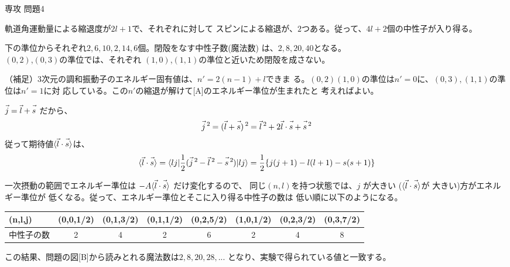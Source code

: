 \documentclass[fleqn]{jbook}
\begin{document}
\begin{answer}{専攻 問題4}{}
\def\Bracket#1#2#3{\langle{#1}|{#2}|{#3}\rangle}
\def\Mean#1{\langle{#1}\rangle}
\def\Vec#1{\vec{\mathstrut #1}}
\def\sqr{\,\raisebox{1ex}{\scriptsize{2}}}
\def\Ca{\Atom{Ca}{20}{41}$_{21}$}
\def\Sc{\Atom{Sc}{21}{41}$_{20}$}

\begin{subanswers}
\SubAnswer
  \begin{subsubanswers}
  \SubSubAnswer
    軌道角運動量による縮退度が$2l+1$で、それぞれに対して
    スピンによる縮退が、$2$つある。従って、$4l+2$個の中性子が入り得る。

  \SubSubAnswer
    下の準位からそれぞれ$2,6,10,2,14,6$個。閉殻をなす中性子数(魔法数)
    は、$2,8,20,40$となる。\\$(0,2)$,$(0,3)$の準位では、それぞれ
    $(1,0)$,$(1,1)$の準位と近いため閉殻を成さない。

（補足）3次元の調和振動子のエネルギー固有値は、$n'=2(n-1)+l$できま
る。$(0,2)(1,0)$の準位は$n'=0$に、$(0,3),(1,1)$の準位は$n'=1$に対
応している。この$n'$の縮退が解けて[A]のエネルギー準位が生まれたと
考えればよい。

  \end{subsubanswers}

\SubAnswer
  \begin{subsubanswers}
  \SubSubAnswer
    $\Vec{j}=\Vec{l}+\Vec{s}\ $だから、
%
    \[\Vec{j}\sqr%
        = (\Vec{l}+\Vec{s})\sqr%
        = \Vec{l}\sqr + 2\Vec{l}\cdot\Vec{s} + \Vec{s}\sqr \]
%
    従って期待値$\Mean{\Vec{l}\cdot\Vec{s}}$は、
%
    \[ \Mean{\Vec{l}\cdot\Vec{s}}%
      = \Bracket{lj}{\frac{1}{2}(\Vec{j}\sqr-\Vec{l}\sqr-\Vec{s}\sqr)}{lj}%
      = \frac{1}{2}\{j(j+1)-l(l+1)-s(s+1)\} \]
%

  \SubSubAnswer
    一次摂動の範囲でエネルギー準位は
    $-A\Mean{\Vec{l}\cdot\Vec{s}}$
    だけ変化するので、
    同じ$(n,l)$を持つ状態では、$j$ が大きい
    ($\Mean{\Vec{l}\cdot\Vec{s}}$が
    大きい)方がエネルギー準位が
    低くなる。従って、エネルギー準位とそこに入り得る中性子の数は
    低い順に以下のようになる。

    \begin{tabular}{|l|c|c|c|c|c|c|c|} \hline
      (n,l,j) & (0,0,1/2) & (0,1,3/2) & (0,1,1/2) & (0,2,5/2) & (1,0,1/2) & (0,2,3/2) & (0,3,7/2) \\ \hline
      中性子の数 & 2 & 4 & 2 & 6 & 2 & 4 & 8 \\ \hline
    \end{tabular}

    この結果、問題の図[B]から読みとれる魔法数は$2,8,20,28,...$
    となり、実験で得られている値と一致する。


\end{subsubanswers}
\end{subanswers}
\end{answer}
\end{document}
